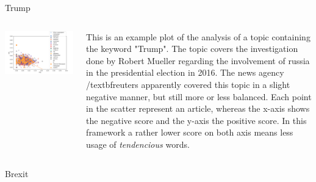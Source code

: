 \documentclass[final]{beamer}
\newlength{\twocolwid}
\begin{document}
\begin{frame}[t]
\begin{columns}[t]
\begin{column}{\twocolwid}
\begin{block}{Trump}
\begin{columns}[onlytextwidth]
    \begin{column}{.45\textwidth}
        \includegraphics[width=0.8\linewidth]{poster/trump_11_reuters.png} 
    \end{column}
    \begin{column}{.55\textwidth}
        This is an example plot of the analysis of a topic containing the keyword "Trump". The topic covers the investigation done by Robert Mueller regarding the involvement of russia in the presidential election in 2016. The news agency /textbf{reuters} apparently covered this topic in a slight negative manner, but still more or less balanced. Each point in the scatter represent an article, whereas the x-axis shows the negative score and the y-axis the positive score. In this framework a rather lower score on both axis means less usage of \textit{tendencious} words.
    \end{column}
\end{columns}

\end{block}


\begin{block}{Brexit {}}



\end{block}
\end{column}
\end{columns}
\end{frame}
\end{document}
